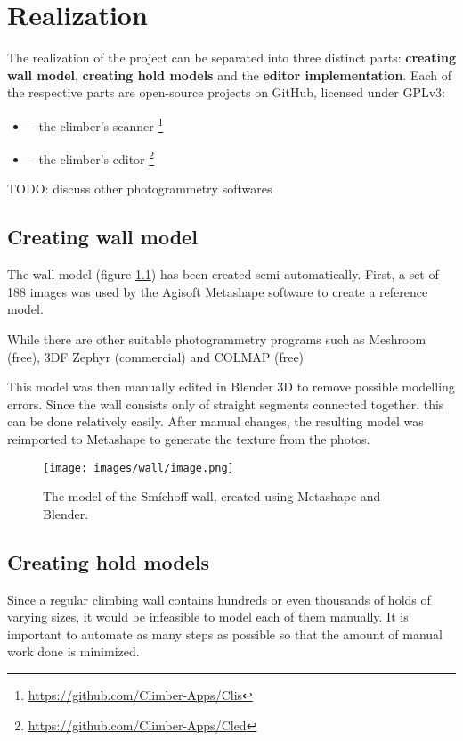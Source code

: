 \chapter{Realization}\label{sec:realization}

The realization of the project can be separated into three distinct parts: \textbf{creating wall model}, \textbf{creating hold models} and the \textbf{editor implementation}.
Each of the respective parts are open-source projects on GitHub, licensed under GPLv3:
\begin{itemize}
	\item \raisebox{-0.08em}{} -- the climber's scanner \footnote{\url{https://github.com/Climber-Apps/Clis}}
	\item \raisebox{-0.08em}{} -- the climber's editor \footnote{\url{https://github.com/Climber-Apps/Cled}}
\end{itemize}

TODO: discuss other photogrammetry softwares

\section{Creating wall model}
The wall model (figure \ref{fig:model}) has been created semi-automatically.
First, a set of 188 images was used by the Agisoft Metashape software to create a reference model.

While there are other suitable photogrammetry programs such as Meshroom (free), 3DF Zephyr (commercial) and COLMAP (free)

This model was then manually edited in Blender 3D to remove possible modelling errors.
Since the wall consists only of straight segments connected together, this can be done relatively easily.
After manual changes, the resulting model was reimported to Metashape to generate the texture from the photos.

\begin{figure}[H]
	\centering
	\texttt{[image: images/wall/image.png]}
	\caption{The model of the Smíchoff wall, created using Metashape and Blender.}
	\label{fig:model}
\end{figure}


\section{Creating hold models}
Since a regular climbing wall contains hundreds or even thousands of holds of varying sizes, it would be infeasible to model each of them manually.
It is important to automate as many steps as possible so that the amount of manual work done is minimized.

